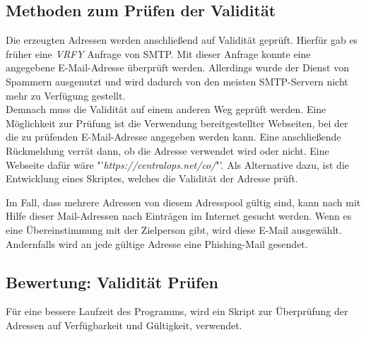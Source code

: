 \subsection{Methoden zum Prüfen der Validität}
Die erzeugten Adressen werden anschließend auf Validität geprüft. Hierfür gab es früher eine \textit{VRFY} Anfrage von SMTP. Mit dieser Anfrage konnte eine angegebene E-Mail-Adresse überprüft werden. Allerdings wurde der Dienst von Spammern ausgenutzt und wird dadurch von den meisten SMTP-Servern nicht mehr zu Verfügung gestellt.\cite{balduzzi2010abusing}\\
Demnach muss die Validität auf einem anderen Weg geprüft werden. Eine Möglichkeit zur Prüfung ist die Verwendung bereitgestellter Webseiten, bei der die zu prüfenden E-Mail-Adresse angegeben werden kann. Eine anschließende Rückmeldung verrät dann, ob die Adresse verwendet wird oder nicht. Eine Webseite dafür wäre "'\textit{https://centralops.net/co/}"'. Als Alternative dazu, ist die Entwicklung eines Skriptes, welches die Validität der Adresse prüft.

Im Fall, dass mehrere Adressen von diesem Adresspool gültig sind, kann nach mit Hilfe dieser Mail-Adressen nach Einträgen im Internet gesucht werden. Wenn es eine Übereinstimmung mit der Zielperson gibt, wird diese E-Mail ausgewählt. Andernfalls wird an jede gültige Adresse eine Phishing-Mail gesendet. 

\subsection{Bewertung: Validität Prüfen}
Für eine bessere Laufzeit des Programms, wird ein Skript zur Überprüfung der Adressen auf Verfügbarkeit und Gültigkeit, verwendet.	

